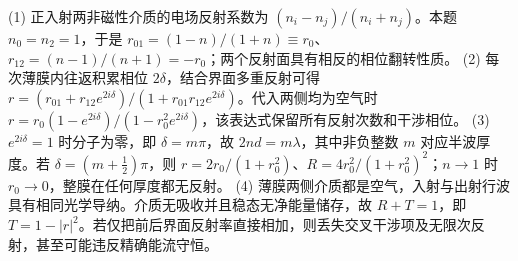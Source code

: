 (1) 正入射两非磁性介质的电场反射系数为 \((n_i-n_j)/(n_i+n_j)\)。本题 \(n_0=n_2=1\)，于是 \(r_{01}=(1-n)/(1+n)\equiv r_0\)、\(r_{12}=(n-1)/(n+1)=-r_0\)；两个反射面具有相反的相位翻转性质。
(2) 每次薄膜内往返积累相位 \(2\delta\)，结合界面多重反射可得 \(r=(r_{01}+r_{12}e^{2i\delta})/(1+r_{01}r_{12}e^{2i\delta})\)。代入两侧均为空气时 \(r=r_0(1-e^{2i\delta})/(1-r_0^2e^{2i\delta})\)，该表达式保留所有反射次数和干涉相位。
(3) \(e^{2i\delta}=1\) 时分子为零，即 \(\delta=m\pi\)，故 \(2nd=m\lambda\)，其中非负整数 \(m\) 对应半波厚度。若 \(\delta=(m+\frac12)\pi\)，则 \(r=2r_0/(1+r_0^2)\)、\(R=4r_0^2/(1+r_0^2)^2\)；\(n\to1\) 时 \(r_0\to0\)，整膜在任何厚度都无反射。
(4) 薄膜两侧介质都是空气，入射与出射行波具有相同光学导纳。介质无吸收并且稳态无净能量储存，故 \(R+T=1\)，即 \(T=1-|r|^2\)。若仅把前后界面反射率直接相加，则丢失交叉干涉项及无限次反射，甚至可能违反精确能流守恒。
